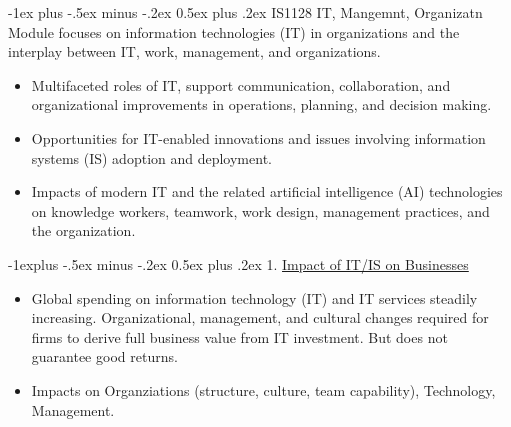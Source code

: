 \documentclass[12pt, landscape]{article}
\makeatletter
\renewcommand{\section}{\@startsection{section}{1}{0mm}%
                                {-1ex plus -.5ex minus -.2ex}%
                                {0.5ex plus .2ex}%
                                {\normalfont\large\bfseries}}
\renewcommand{\subsection}{\@startsection{subsection}{2}{0mm}%
                                {-1explus -.5ex minus -.2ex}%
                                {0.5ex plus .2ex}%
                                {\normalfont\normalsize\bfseries}}
\makeatother
\begin{document}
\raggedright
\footnotesize
\begin{multicols*}{3}

\setlength{\columnseprule}{0pt}
\setlength{\premulticols}{1pt}
\setlength{\postmulticols}{1pt}
\setlength{\multicolsep}{2pt}
\setlength{\columnsep}{2pt}

\section{IS1128 IT, Mangemnt, Organizatn}
Module focuses on information technologies (IT) in organizations and the interplay between IT, work, management, and organizations. 
\begin{itemize}
\item Multifaceted roles of IT, support communication, collaboration, and organizational improvements in operations, planning, and decision making.
\item Opportunities for IT-enabled innovations and issues involving information systems (IS) adoption and deployment.
\item Impacts of modern IT and the related artificial intelligence (AI) technologies on knowledge workers, teamwork, work design, management practices, and the organization. 
\end{itemize}


\subsection{1. \underline{Impact of IT/IS on Businesses}}
\begin{itemize}
\item Global spending on information technology (IT) and IT services steadily increasing. Organizational, management, and cultural changes required for firms to derive full business value from IT investment. But does not guarantee good returns.
\item Impacts on Organziations (structure, culture, team capability), Technology, Management. 
\end{itemize}


\end{multicols*}
\end{document}
